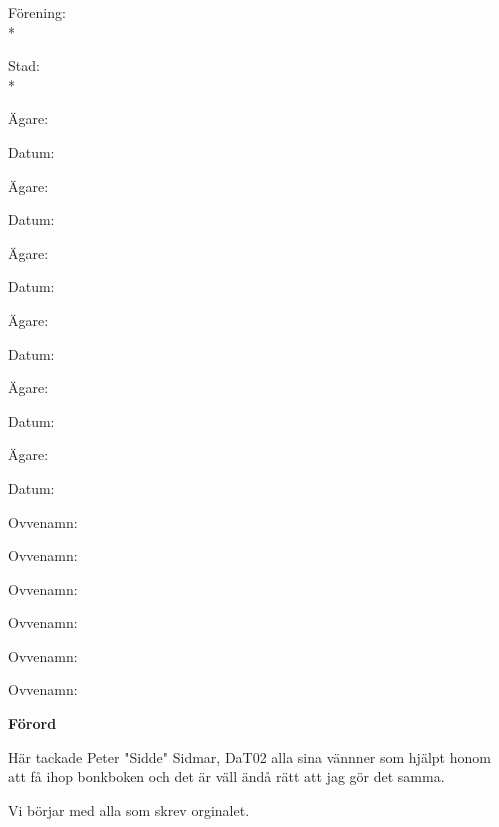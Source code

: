 \pagestyle{Inledning}


Förening: \hrulefill\\*%

Stad: \hrulefill\\*%



\begin{multicols}{2}
  Ägare: \hrulefill%

  Datum: \hrulefill%

  Ägare: \hrulefill%

  Datum: \hrulefill%

  Ägare: \hrulefill%

  Datum: \hrulefill%

  Ägare: \hrulefill%

  Datum: \hrulefill%

  Ägare: \hrulefill%

  Datum: \hrulefill%

  Ägare: \hrulefill%

  Datum: \hrulefill%

  \hfill

  Ovvenamn: \hrulefill%

  \hfill

  Ovvenamn: \hrulefill%

  \hfill

  Ovvenamn: \hrulefill%

  \hfill

  Ovvenamn: \hrulefill%

  \hfill

  Ovvenamn: \hrulefill%

  \hfill

  Ovvenamn: \hrulefill%

  \hfill
\end{multicols}



\newpage

\textbf{Förord}

Här tackade Peter "Sidde" Sidmar, DaT02 alla sina vännner som hjälpt honom
att få ihop bonkboken och det är väll ändå rätt att jag gör det samma.

Vi börjar med alla som skrev orginalet.

